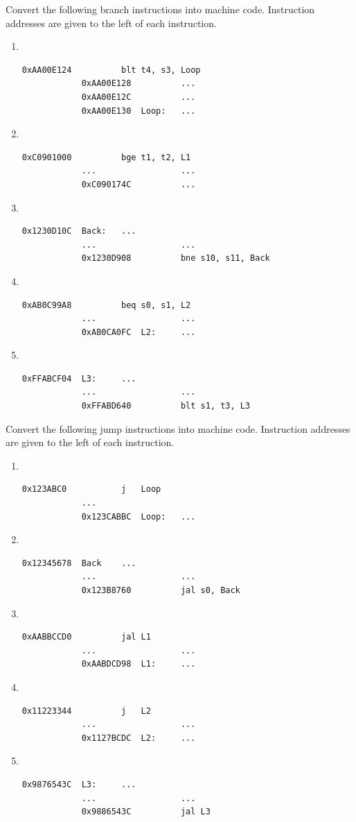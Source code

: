 \documentclass[12pt]{article}
\newenvironment{ex}[2][Exercise]{\begin{trivlist}
		\item[\hskip \labelsep {\bfseries #1}\hskip \labelsep {\bfseries #2.}]}{\end{trivlist}}
\begin{document}
\begin{ex}{6.29}
	Convert the following branch instructions into machine code. Instruction addresses
	are given to the left of each instruction.
	\begin{enumerate}[label=(\alph*)]
		\item 
		\
		\begin{lstlisting}[language={}]
			0xAA00E124			blt	t4,	s3,	Loop
			0xAA00E128			...
			0xAA00E12C			...
			0xAA00E130	Loop:	...
		\end{lstlisting}
		\item 
		\
		\begin{lstlisting}[language={}]
			0xC0901000			bge	t1,	t2,	L1
			...					...
			0xC090174C			...
		\end{lstlisting}
		\item 
		\
		\begin{lstlisting}[language={}]
			0x1230D10C	Back:	...
			...					...
			0x1230D908			bne	s10, s11, Back
		\end{lstlisting}
		\item 
		\
		\begin{lstlisting}[language={}]
			0xAB0C99A8			beq	s0,	s1,	L2
			...					...
			0xAB0CA0FC	L2:		...	
		\end{lstlisting}
		\item
		\
		\begin{lstlisting}[language={}]
			0xFFABCF04	L3:		...
			...					...
			0xFFABD640			blt	s1,	t3,	L3
		\end{lstlisting}
	\end{enumerate}
\end{ex}

\begin{ex}{6.30}
	Convert the following jump instructions into machine code. Instruction
	addresses are given to the left of each instruction.
	\begin{enumerate}[label=(\alph*)]
		\item 
		\
		\begin{lstlisting}[language={}]
			0x123ABC0			j	Loop
			...
			0x123CABBC	Loop:	...
		\end{lstlisting}
		\item 
		\
		\begin{lstlisting}[language={}]
			0x12345678	Back	...
			...					...
			0x123B8760			jal	s0,	Back
		\end{lstlisting}
		\item 
		\
		\begin{lstlisting}[language={}]
			0xAABBCCD0			jal	L1
			...					...
			0xAABDCD98	L1:		...
		\end{lstlisting}
		\item
		\
		\begin{lstlisting}[language={}]
			0x11223344			j	L2
			...					...
			0x1127BCDC	L2:		...
		\end{lstlisting}
		\item 
		\
		\begin{lstlisting}[language={}]
			0x9876543C	L3:		...
			...					...
			0x9886543C			jal	L3
		\end{lstlisting}
	\end{enumerate}
\end{ex}
\end{document}
